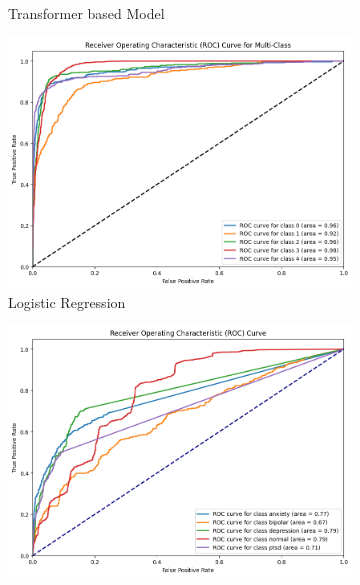 \begin{figure}[H]
\begin{subfigure}[b]{0.49\textwidth}
        \caption{Transformer based Model}
        \label{dfdl146}  %
    \end{subfigure}
    \label{fig:lstm_comparison}
    \caption{ROC AUC for DL Models}
    \vspace{0.75cm}
    \begin{subfigure}[b]{0.49\textwidth}
        \centering
        \includegraphics[width=\textwidth]{Images/HP LR ROC.png}
        \caption{Logistic Regression}
        \label{LSTMROC3}  %
    \end{subfigure}
    \hfill
    \vspace{0.5cm}
    \begin{subfigure}[b]{0.49\textwidth}
        \centering
        \includegraphics[width=\textwidth]{Images/HP KNN ROC.png}

\end{subfigure}
\end{figure}
